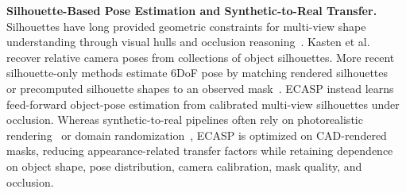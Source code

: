 \noindent\textbf{Silhouette-Based Pose Estimation and Synthetic-to-Real Transfer.}
Silhouettes have long provided geometric constraints for multi-view shape understanding through visual hulls and occlusion reasoning~\cite{laurentini1994visual,Guan2010}.
Kasten et al.~\cite{kasten2023multiviewpose} recover relative camera poses from collections of object silhouettes.
More recent silhouette-only methods estimate 6DoF pose by matching rendered silhouettes~\cite{cui2024stipose} or precomputed silhouette shapes to an observed mask~\cite{sengupta2026gloptipos}.
ECASP instead learns feed-forward object-pose estimation from calibrated multi-view silhouettes under occlusion.
Whereas synthetic-to-real pipelines often rely on photorealistic rendering~\cite{denninger2019blenderproc} or domain randomization~\cite{tobin2017domainrandomization}, ECASP is optimized on CAD-rendered masks, reducing appearance-related transfer factors while retaining dependence on object shape, pose distribution, camera calibration, mask quality, and occlusion.
